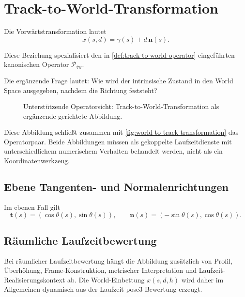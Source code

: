 \section{Track-to-World-Transformation}

\begin{definition}
\label{def:state-track-to-world-runtime}
Die Vorwärtstransformation lautet
\begin{equation}
x(s,d)=\gamma(s)+d\,\mathbf n(s).
\label{eq:state-track-to-world-runtime}
\end{equation}
\end{definition}

Diese Beziehung spezialisiert den in
\cref{def:track-to-world-operator} eingeführten kanonischen Operator
\(\mathcal P_{\mathrm{tw}}\).

Die ergänzende Frage lautet: Wie wird der intrinsische Zustand in den World
Space ausgegeben, nachdem die Richtung feststeht?

\begin{figure}[htbp]
\centering

\caption{Unterstützende Operatorsicht: Track-to-World-Transformation als
ergänzende gerichtete Abbildung.}
\label{fig:track-to-world-transformation-support}
\end{figure}

Diese Abbildung schließt zusammen mit
\cref{fig:world-to-track-transformation} das Operatorpaar. Beide Abbildungen
müssen als gekoppelte Laufzeitdienste mit unterschiedlichem numerischem
Verhalten behandelt werden, nicht als ein Koordinatenwerkzeug.

\subsection{Ebene Tangenten- und Normalenrichtungen}

Im ebenen Fall gilt
\[
\mathbf t(s)=(\cos\theta(s),\sin\theta(s)),
\qquad
\mathbf n(s)=(-\sin\theta(s),\cos\theta(s)).
\]

\subsection{Räumliche Laufzeitbewertung}

Bei räumlicher Laufzeitbewertung hängt die Abbildung zusätzlich von Profil,
Überhöhung, Frame-Konstruktion, metrischer Interpretation und
Laufzeit-Realisierungskontext ab. Die World-Einbettung \(x(s,d,h)\) wird daher
im Allgemeinen dynamisch aus der Laufzeit-pose3-Bewertung erzeugt.

